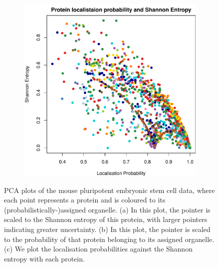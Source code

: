 \documentclass[12pt,english]{article}
\begin{document}
\begin{figure}[h]
  \begin{subfigure}[t]{0.5\textwidth}
    \centering
\includegraphics{tagm-029}
    \caption{}
  \end{subfigure}

  \caption{PCA plots of the mouse pluripotent embryonic stem cell data, where
    each point represents a protein and is coloured
    to its (probabilistically-)assigned organelle. (a) In this plot, the pointer is
    scaled to the Shannon entropy of this protein, with
    larger pointers indicating greater uncertainty.
    (b) In this plot, the pointer is scaled to the probability
    of that protein belonging to its assigned organelle. (c) We plot
    the localisation probabilities against the Shannon entropy
    with each protein.}
  \label{figure:proteomeuncertainty}
 \end{figure}
\end{document}
